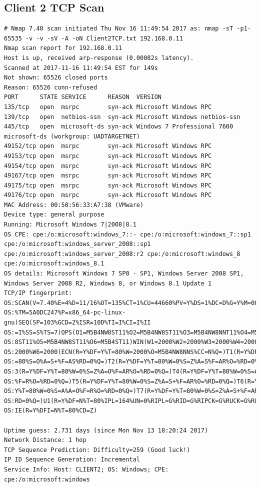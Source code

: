 \documentclass[12pt,a4paper]{article}
\begin{document}
\begin{appendices}
	\subsection{Client 2 TCP Scan}
		\begin{lstlisting}
# Nmap 7.40 scan initiated Thu Nov 16 11:49:54 2017 as: nmap -sT -p1-65535 -v -v -sV -A -oN Client2TCP.txt 192.168.0.11
Nmap scan report for 192.168.0.11
Host is up, received arp-response (0.00082s latency).
Scanned at 2017-11-16 11:49:54 EST for 149s
Not shown: 65526 closed ports
Reason: 65526 conn-refused
PORT      STATE SERVICE      REASON  VERSION
135/tcp   open  msrpc        syn-ack Microsoft Windows RPC
139/tcp   open  netbios-ssn  syn-ack Microsoft Windows netbios-ssn
445/tcp   open  microsoft-ds syn-ack Windows 7 Professional 7600 microsoft-ds (workgroup: UADTARGETNET)
49152/tcp open  msrpc        syn-ack Microsoft Windows RPC
49153/tcp open  msrpc        syn-ack Microsoft Windows RPC
49154/tcp open  msrpc        syn-ack Microsoft Windows RPC
49167/tcp open  msrpc        syn-ack Microsoft Windows RPC
49175/tcp open  msrpc        syn-ack Microsoft Windows RPC
49176/tcp open  msrpc        syn-ack Microsoft Windows RPC
MAC Address: 00:50:56:33:A7:38 (VMware)
Device type: general purpose
Running: Microsoft Windows 7|2008|8.1
OS CPE: cpe:/o:microsoft:windows_7::- cpe:/o:microsoft:windows_7::sp1 cpe:/o:microsoft:windows_server_2008::sp1 cpe:/o:microsoft:windows_server_2008:r2 cpe:/o:microsoft:windows_8 cpe:/o:microsoft:windows_8.1
OS details: Microsoft Windows 7 SP0 - SP1, Windows Server 2008 SP1, Windows Server 2008 R2, Windows 8, or Windows 8.1 Update 1
TCP/IP fingerprint:
OS:SCAN(V=7.40%E=4%D=11/16%OT=135%CT=1%CU=44660%PV=Y%DS=1%DC=D%G=Y%M=005056
OS:%TM=5A0DC247%P=x86_64-pc-linux-gnu)SEQ(SP=103%GCD=2%ISR=10D%TI=I%CI=I%II
OS:=I%SS=S%TS=7)OPS(O1=M5B4NW8ST11%O2=M5B4NW8ST11%O3=M5B4NW8NNT11%O4=M5B4NW
OS:8ST11%O5=M5B4NW8ST11%O6=M5B4ST11)WIN(W1=2000%W2=2000%W3=2000%W4=2000%W5=
OS:2000%W6=2000)ECN(R=Y%DF=Y%T=80%W=2000%O=M5B4NW8NNS%CC=N%Q=)T1(R=Y%DF=Y%T
OS:=80%S=O%A=S+%F=AS%RD=0%Q=)T2(R=Y%DF=Y%T=80%W=0%S=Z%A=S%F=AR%O=%RD=0%Q=)T
OS:3(R=Y%DF=Y%T=80%W=0%S=Z%A=O%F=AR%O=%RD=0%Q=)T4(R=Y%DF=Y%T=80%W=0%S=A%A=O
OS:%F=R%O=%RD=0%Q=)T5(R=Y%DF=Y%T=80%W=0%S=Z%A=S+%F=AR%O=%RD=0%Q=)T6(R=Y%DF=
OS:Y%T=80%W=0%S=A%A=O%F=R%O=%RD=0%Q=)T7(R=Y%DF=Y%T=80%W=0%S=Z%A=S+%F=AR%O=%
OS:RD=0%Q=)U1(R=Y%DF=N%T=80%IPL=164%UN=0%RIPL=G%RID=G%RIPCK=G%RUCK=G%RUD=G)
OS:IE(R=Y%DFI=N%T=80%CD=Z)

Uptime guess: 2.731 days (since Mon Nov 13 18:20:24 2017)
Network Distance: 1 hop
TCP Sequence Prediction: Difficulty=259 (Good luck!)
IP ID Sequence Generation: Incremental
Service Info: Host: CLIENT2; OS: Windows; CPE: cpe:/o:microsoft:windows


\end{lstlisting}
\end{appendices}
\end{document}
